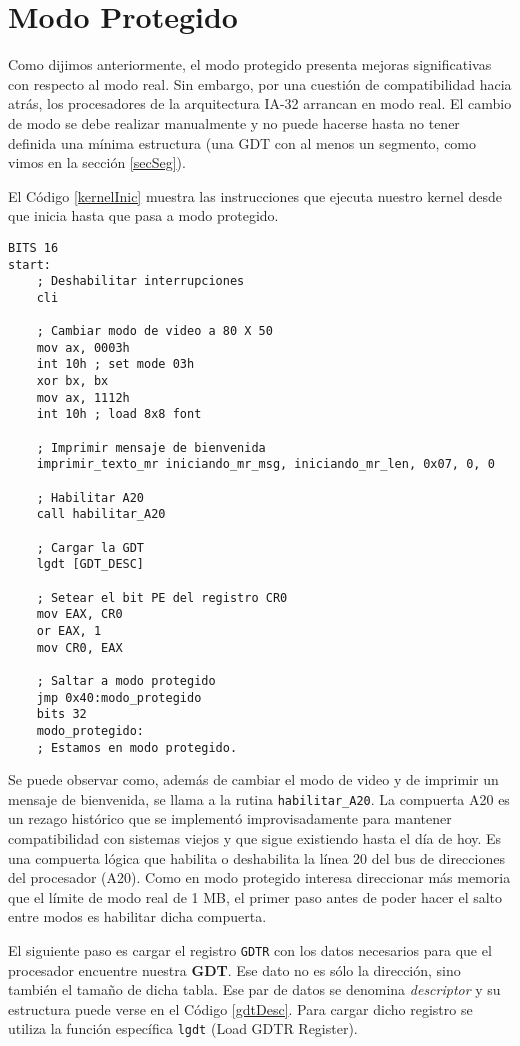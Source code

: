 \documentclass[a4paper]{article}
\begin{document}
\section{Modo Protegido}
Como dijimos anteriormente, el modo protegido presenta mejoras significativas con respecto al modo real. Sin embargo, por una cuestión de compatibilidad hacia atrás, los procesadores de la arquitectura IA-32 arrancan en modo real. El cambio de modo se debe realizar manualmente y no puede hacerse hasta no tener definida una mínima estructura (una GDT con al menos un segmento, como vimos en la sección \ref{secSeg}).

El Código \ref{kernelInic} muestra las instrucciones que ejecuta nuestro kernel desde que inicia hasta que pasa a modo protegido.


\begin{lstlisting}[caption={Pasaje a modo protegido -- \textbf{kernel.asm}}, label=kernelInic, language={[x86masm]Assembler}]
BITS 16
start:
    ; Deshabilitar interrupciones
    cli

    ; Cambiar modo de video a 80 X 50
    mov ax, 0003h
    int 10h ; set mode 03h
    xor bx, bx
    mov ax, 1112h
    int 10h ; load 8x8 font

    ; Imprimir mensaje de bienvenida
    imprimir_texto_mr iniciando_mr_msg, iniciando_mr_len, 0x07, 0, 0
 
    ; Habilitar A20
	call habilitar_A20

    ; Cargar la GDT
	lgdt [GDT_DESC]

    ; Setear el bit PE del registro CR0
    mov EAX, CR0
    or EAX, 1
    mov CR0, EAX

    ; Saltar a modo protegido
	jmp 0x40:modo_protegido
	bits 32
	modo_protegido:		
	; Estamos en modo protegido.	
\end{lstlisting}

Se puede observar como, además de cambiar el modo de video y de imprimir un mensaje de bienvenida, se llama a la rutina \texttt{habilitar_A20}. La compuerta A20 es un rezago histórico que se implementó improvisadamente para mantener compatibilidad con sistemas viejos y que sigue existiendo hasta el día de hoy. Es una compuerta lógica que habilita o deshabilita la línea 20 del bus de direcciones del procesador (A20). Como en modo protegido interesa direccionar más memoria que el límite de modo real de 1 MB, el primer paso antes de poder hacer el salto entre modos es habilitar dicha compuerta.

El siguiente paso es cargar el registro \texttt{GDTR} con los datos necesarios para que el procesador encuentre nuestra \textbf{GDT}. Ese dato no es sólo la dirección, sino también el tamaño de dicha tabla. Ese par de datos se denomina \textit{descriptor} y su estructura puede verse en el Código \ref{gdtDesc}. Para cargar dicho registro se utiliza la función específica \texttt{lgdt} (Load GDTR Register).
\end{document}
